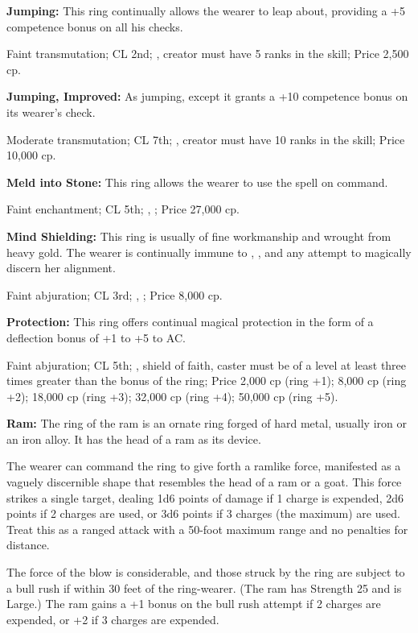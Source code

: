 \textbf{Jumping:} This ring continually allows the wearer to leap about, providing a +5 competence bonus on all his  checks.

Faint transmutation; CL 2nd; , creator must have 5 ranks in the  skill; Price 2,500 cp.

\textbf{Jumping, Improved:} As jumping, except it grants a +10 competence bonus on its wearer's  check.

Moderate transmutation; CL 7th; , creator must have 10 ranks in the  skill; Price 10,000 cp.

\textbf{Meld into Stone:} This ring allows the wearer to use the spell  on command.

Faint enchantment; CL 5th; , ; Price 27,000 cp.

\textbf{Mind Shielding:} This ring is usually of fine workmanship and wrought from heavy gold. The wearer is continually immune to , , and any attempt to magically discern her alignment.

Faint abjuration; CL 3rd; , ; Price 8,000 cp.

\textbf{Protection:} This ring offers continual magical protection in the form of a deflection bonus of +1 to +5 to AC.

Faint abjuration; CL 5th; , shield of faith, caster must be of a level at least three times greater than the bonus of the ring; Price 2,000 cp (ring +1); 8,000 cp (ring +2); 18,000 cp (ring +3); 32,000 cp (ring +4); 50,000 cp (ring +5).

\textbf{Ram:} The ring of the ram is an ornate ring forged of hard metal, usually iron or an iron alloy. It has the head of a ram as its device.

The wearer can command the ring to give forth a ramlike force, manifested as a vaguely discernible shape that resembles the head of a ram or a goat. This force strikes a single target, dealing 1d6 points of damage if 1 charge is expended, 2d6 points if 2 charges are used, or 3d6 points if 3 charges (the maximum) are used. Treat this as a ranged attack with a 50-foot maximum range and no penalties for distance.

The force of the blow is considerable, and those struck by the ring are subject to a bull rush if within 30 feet of the ring-wearer. (The ram has Strength 25 and is Large.) The ram gains a +1 bonus on the bull rush attempt if 2 charges are expended, or +2 if 3 charges are expended.

